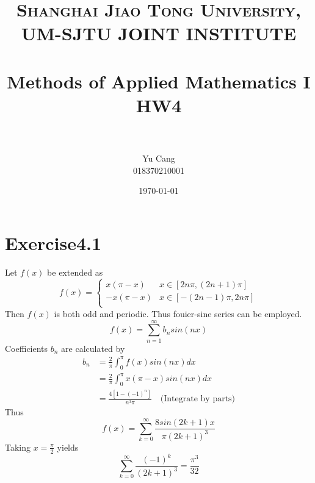 \documentclass[paper=a4, fontsize=11pt]{scrartcl} %
\title{	
\normalfont \normalsize 
\textsc{Shanghai Jiao Tong University, UM-SJTU JOINT INSTITUTE} \\ [25pt] %
\horrule{0.5pt} \\[0.4cm] %
\huge Methods of Applied Mathematics I\\ HW4 \\ %
\horrule{2pt} \\[0.5cm] %
}
\author{Yu Cang \\ 018370210001} %
\date{\normalsize \today} %
\numberwithin{equation}{section} %
\numberwithin{figure}{section} %
\numberwithin{table}{section} %
\begin{document}
\maketitle %

\section{Exercise4.1}
	Let $f(x)$ be extended as
	\begin{equation}
		f(x) = \left\{
			\begin{aligned}
				x(\pi - x) & x\in [2n\pi, (2n+1)\pi] \\
				-x(\pi - x) & x\in [-(2n-1)\pi, 2n\pi] \\
			\end{aligned}
		\right.
	\end{equation}
	Then $f(x)$ is both odd and periodic. Thus fouier-sine series can be employed.
	\begin{equation}
		f(x) = \sum_{n=1}^{\infty} b_n sin(nx)
	\end{equation} 
	Coefficients $b_n$ are calculated by
	\begin{equation}
		\begin{aligned}
			b_n  & = \frac{2}{\pi} \int_{0}^{\pi} f(x) sin(nx) dx \\
				 & = \frac{2}{\pi} \int_{0}^{\pi} x(\pi - x) sin(nx) dx \\
			     & = \frac{4[1-(-1)^n]}{n^3 \pi} \quad \text{(Integrate by parts)}
		\end{aligned}
	\end{equation}
	Thus
	\begin{equation}
		f(x) = \sum_{k=0}^{\infty} \frac{8 sin(2k+1)x}{\pi (2k+1)^3}
	\end{equation}
	Taking $x = \frac{\pi}{2}$ yields
	\begin{equation}
		\sum_{k=0}^{\infty} \frac{(-1)^k}{(2k+1)^3} = \frac{\pi^3}{32}
	\end{equation}
\end{document}
